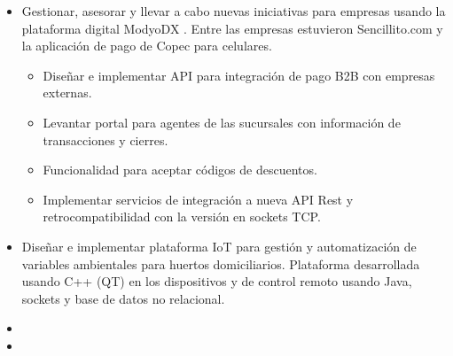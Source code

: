 \documentclass[11pt,letterpaper,sans]{moderncv}        %
\begin{document}
\begin{itemize}
\vspace{6pt}

\item{
{\vspace{3pt}
Gestionar, asesorar y llevar a cabo nuevas iniciativas para empresas usando la plataforma digital ModyoDX . Entre las empresas estuvieron Sencillito.com y la aplicación de pago de Copec para celulares.
\begin{itemize}
\item Diseñar e implementar API para integración de pago B2B con empresas externas.
\item Levantar portal para agentes de las sucursales con información de transacciones y cierres.
\item Funcionalidad para aceptar códigos de descuentos.
\item Implementar servicios de integración a nueva API Rest y retrocompatibilidad con la versión en sockets TCP.
\end{itemize}
}}

\vspace{6pt}

\item{
{\vspace{3pt}
Diseñar e implementar plataforma IoT para gestión y automatización de variables ambientales para huertos domiciliarios.  Plataforma desarrollada usando C++ (QT) en los dispositivos y de control remoto usando Java, sockets y base de datos no relacional.
}}

\vspace{6pt}

\item{}

\vspace{6pt}

\item{}


\end{itemize}
\end{document}

